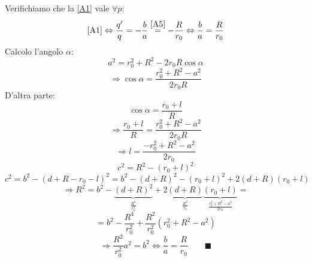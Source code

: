 \documentclass[a4paper,11pt]{report}
\begin{document}
Verifichiamo che la \eqref{A1} vale $\forall p$:
\[
\eqref{A1}\Leftrightarrow \frac{q'}{q} = -\frac{b}{a} \overset{\eqref{A5}}{=} -\frac{R}{r_0} \Leftrightarrow \frac{b}{a}=\frac{R}{r_0}
\]
Calcolo l'angolo $\alpha$: 
\[
a^2=r_0^2 + R^2 - 2r_0 R\cos\alpha
\]
\[
\Rightarrow \cos\alpha =\frac{r_0^2 + R^2 - a^2}{2r_0R}
\]
D'altra parte: 
\[
\cos\alpha=\frac{r_0+l}{R}
\]
\[
\Rightarrow \frac{r_0+l}{R}=\frac{r_0^2 +R^2 - a^2}{2r_0 R}
\]
\[
\Rightarrow l=\frac{-r_0^2 + R^2 - a^2}{2r_0}
\]
\[
c^2=R^2 - (r_0+l)^2 
\]
\[
c^2=b^2 - (d +R-r_0 -l)^2 = b^2 -(d+R)^2 - (r_0+l)^2 + 2(d+R)(r_0+l)
\]
\[
\Rightarrow R^2 = b^2 - \underbrace{(d+R)^2}_{\frac{R^4}{r_0^2}} + 2 \underbrace{(d+R)}_{\frac{R^2}{r_0}} \underbrace{(r_0+l)}_{\frac{r_0^2 + R^2 - a^2}{2r_0}}=
\]
\[
= b^2 - \frac{R^4}{r_0^2} + \frac{R^2}{r_0^2}(r_0^2 + R^2 - a^2)
\]
\[
\Rightarrow \frac{R^2}{r_0^2}a^2 = b^2 \Leftrightarrow \frac{b}{a}=\frac{R}{r_0} \qquad \blacksquare
\]
\end{document}
